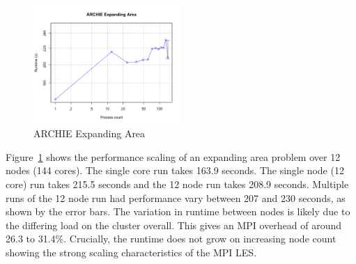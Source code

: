 \begin{figure}[h]
    \includegraphics[width=0.5\textwidth]{graphs/ARCHIE-expanding-area.png}
    \caption{ARCHIE Expanding Area}
    \label{fig:archieexpandingarea}
\end{figure}

Figure~\ref{fig:archieexpandingarea} shows the performance scaling of an
expanding area problem over 12 nodes (144 cores). The single core run takes
163.9 seconds. The single node (12 core) run takes 215.5 seconds and the 12 node
run takes 208.9 seconds. Multiple runs of the 12 node run had performance vary
between 207 and 230 seconds, as shown by the error bars. The variation in
runtime between nodes is likely due to the differing load on the cluster
overall. This gives an MPI overhead of around 26.3 to 31.4\%. Crucially, the
runtime does not grow on increasing node count showing the strong scaling
characteristics of the MPI LES.
